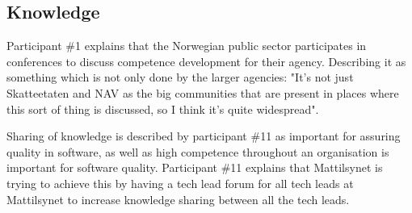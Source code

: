 

\subsection{Knowledge} \label{sec:knowledge}
Participant \#1 explains that the Norwegian public sector participates in conferences to discuss competence development for their agency. Describing it as something which is not only done by the larger agencies: "It's not just Skatteetaten and NAV as the big communities that are present in places where this sort of thing is discussed, so I think it's quite widespread".


Sharing of knowledge is described by participant \#11 as important for assuring quality in software, as well as high competence throughout an organisation is important for software quality. Participant \#11 explains that Mattilsynet is trying to achieve this by having a tech lead forum for all tech leads at Mattilsynet to increase knowledge sharing between all the tech leads.


